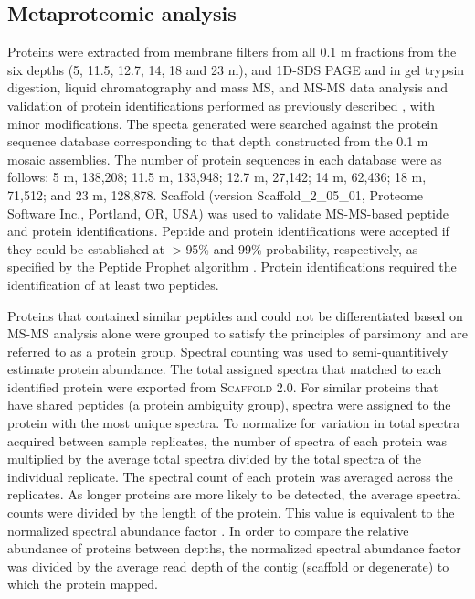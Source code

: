 \subsection{Metaproteomic analysis}
Proteins were extracted from membrane filters from all 0.1 \textmu{}m fractions from the six depths (5, 11.5, 12.7, 14, 18 and 23 m), and \ac{1D-SDS PAGE} and in gel trypsin digestion, liquid chromatography and mass \ac{MS}, and \ac{MS-MS} data analysis and validation of protein identifications performed as previously described \cite{Ng2010a}, with minor modifications.
The specta generated were searched against the protein sequence database corresponding to that depth constructed from the 0.1 \textmu{}m mosaic assemblies. 
The number of protein sequences in each database were as follows: 5 m, 138,208; 11.5 m, 133,948; 12.7 m, 27,142; 14 m, 62,436; 18 m, 71,512; and 23 m, 128,878. 
Scaffold (version Scaffold\_2\_05\_01, Proteome Software Inc., Portland, \textsc{OR}, \textsc{USA}) was used to validate \ac{MS-MS}-based peptide and protein identifications. 
Peptide and protein identifications were accepted if they could be established at $>$95\% and 99\% probability, respectively, as specified by the Peptide Prophet algorithm \cite{Keller2002}. 
Protein identifications required the identification of at least two peptides.
 
Proteins that contained similar peptides and could not be differentiated based on \ac{MS-MS} analysis alone were grouped to satisfy the principles of parsimony and are referred to as a protein group. 
Spectral counting was used to semi-quantitively estimate protein abundance. 
The total assigned spectra that matched to each identified protein were exported from \textsc{Scaffold} 2.0. 
For similar proteins that have shared peptides (a protein ambiguity group), spectra were assigned to the protein with the most unique spectra. 
To normalize for variation in total spectra acquired between sample replicates, the number of spectra of each protein was multiplied by the average total spectra divided by the total spectra of the individual replicate. 
The spectral count of each protein was averaged across the replicates. 
As longer proteins are more likely to be detected, the average spectral counts were divided by the length of the protein. 
This value is equivalent to the normalized spectral abundance factor \cite{Florens2006, Zybailov2006}. 
In order to compare the relative abundance of proteins between depths, the normalized spectral abundance factor was divided by the average read depth of the contig (scaffold or degenerate) to which the protein mapped. 

